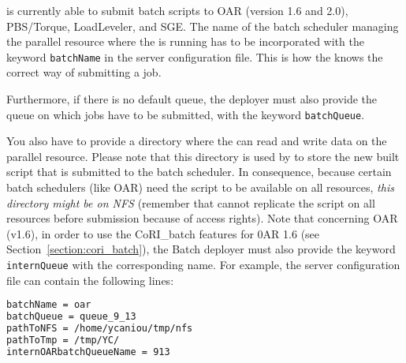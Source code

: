 \diet is currently able to submit batch scripts to
OAR (version 1.6 and 2.0), PBS/Torque, LoadLeveler, and SGE.
%
%
The name of the batch scheduler managing the parallel resource where
the \sed is running has to be incorporated with the keyword
\verb!batchName! in the server configuration file. This is how the \sed knows
the correct way of submitting a job.

Furthermore, if there is no default queue, the \diet deployer must
also provide the queue on which jobs have to be submitted, with the
keyword \verb!batchQueue!.

You also have to provide a directory where the \sed can read and write data on
the parallel resource. Please note that this directory is used by \diet to
store the new built script that is submitted to the batch scheduler. In
consequence, because certain batch schedulers (like OAR) need the script to be
available on all resources, {\it this directory might be on NFS} (remember that
\diet cannot replicate the script on all resources before submission because of
access rights).  Note that concerning OAR (v1.6), in order to use the
CoRI\_batch features for 0AR 1.6 (see Section~\ref{section:cori_batch}), the
Batch \sed deployer must also provide the keyword \verb$internQueue$ with the
corresponding name. For example, the server configuration file can contain the
following lines:

\begin{lstlisting}[language=bash,basewidth={.5em,.4em},fontadjust]
batchName = oar
batchQueue = queue_9_13
pathToNFS = /home/ycaniou/tmp/nfs
pathToTmp = /tmp/YC/
internOARbatchQueueName = 913
\end{lstlisting}




